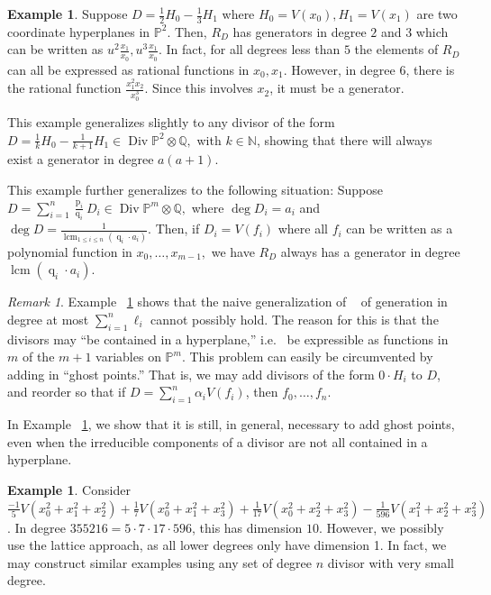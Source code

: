\documentclass{amsart}
\theoremstyle{plain}
\theoremstyle{definition}
\newtheorem{example}[thm]{Example}
\theoremstyle{remark}
\newtheorem{rem}[thm]{Remark}
\numberwithin{equation}{section}
\newcommand\bn{{\mathbb N}}
\newcommand\bq{{\mathbb Q}}
\newcommand\bp{{\mathbb P}}
\DeclareMathOperator\di{Div}
\newcommand\bida{a}
\DeclareMathOperator{\num}{p}
\DeclareMathOperator{\den}{q}
\DeclareMathOperator{\lcm}{lcm}
\begin{document}
\begin{example}
\label{eg:hyperplane}
Suppose $D = \frac{1}{2}H_0 - \frac{1}{3}H_1$ where $H_0 = V(x_0),
H_1 = V(x_1)$ are two coordinate hyperplanes in $\bp^2$. Then, $R_D$
has generators in degree $2$ and $3$ which can be written as $u^2
\frac{x_1}{x_0}, u^3 \frac{x_1}{x_0}.$ In fact, for all degrees
less than $5$ the elements of $R_D$ can all be expressed as
rational functions in $x_0, x_1$. However, in degree $6$, there is
the rational function $\frac{x_1^2 x_2}{x_0^3}$. Since this
involves $x_2$, it must be a generator.

This example generalizes slightly to any divisor of the form $D =
\frac{1}{k}H_0 - \frac{1}{k+1}H_1 \in \di \bp^2 \otimes \bq,$ with
$k \in \bn$, showing that there will always exist a generator in
degree $a(a + 1)$.

This example further generalizes to the following situation:
Suppose $D = \sum_{i=1}^{n} \frac{\num_i}{\den_i}D_i \in \di \bp^m
\otimes \bq,$ where $\deg D_i = \bida_i$ and $\deg D = \frac{1}{\lcm
_{1 \leq i \leq n}(\den_i \cdot \bida_i)}$. Then, if $D_i = V(f_i)$
where all $f_i$ can be written as a polynomial function in $x_0,
\ldots, x_{m-1},$ we have $R_D$ always has a generator in degree
$\lcm(\den_i \cdot \bida_i)$.
\end{example}

\begin{rem}
\label{rem:ghost-motivation}
Example ~\ref{eg:hyperplane} shows that the naive generalization of
~\cite[Theorem 8]{dorney:canonical} of generation in degree at most
$\sum_{i=1}^{n}\ell_i$ cannot possibly hold. The reason for this is
that the divisors may ``be contained in a hyperplane,'' i.e.~ be
expressible as functions in $m$ of the $m+1$ variables on $\bp^m$.
This problem can easily be circumvented by adding in ``ghost
points.'' That is, we may add divisors of the form $0 \cdot H_i$ to
$D$, and reorder so that if $D = \sum_{i=1}^{n}\alpha_i V(f_i)$,
then $f_0, \ldots, f_n$.

In Example ~\ref{eg:radical}, we show that it is still, in general,
necessary to add ghost points, even when the irreducible components
of a divisor are not all contained in a hyperplane.
\end{rem}

\begin{example}
\label{eg:radical}
Consider $\frac{-1}{5}V(x_0^2 + x_1^2 + x_2^2) + \frac{1}{7}V(x_0^2 + x_1^2 +
x_3^2) + \frac{1}{17}V(x_0^2 + x_2^2 + x_3^2) - \frac{1}{596}V(x_1^2 + x_2^2 +
x_3^2)$. In degree $355216 = 5 \cdot 7 \cdot 17 \cdot 596$, this has dimension
$10$. 
However, we possibly use the lattice approach, as all lower degrees only have
dimension 1. In fact, we may construct similar examples using any set of degree
$n$ divisor with very small degree.
\end{example}
\end{document}
